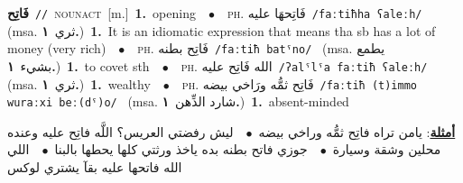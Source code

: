 \documentclass[10pt,a4paper,twoside]{article} %
\begin{document}
\begin{multicols}{2}
{\setlength\topsep{0pt}\textbf{\foreignlanguage{arabic}{فَاتِح}}\ {\color{gray}\texttt{//}\color{black}}\ \textsc{noun\textunderscore act}\ [m.]\ \textbf{1.}~opening\ \ $\bullet$\ \ \textsc{ph.} \color{gray} \foreignlanguage{arabic}{فَاتِحهَا عليه}\color{black}\ {\color{gray}\texttt{/{\sffamily faːtiħha ʕaleːh}/}\color{black}}\ \color{gray} (msa. \foreignlanguage{arabic}{ثري}~\foreignlanguage{arabic}{\textbf{١.}})\color{black}\ \textbf{1.}~It is an idiomatic expression that means tha sb has a lot of money (very rich)\ \ $\bullet$\ \ \textsc{ph.} \color{gray} \foreignlanguage{arabic}{فَاتِح بطنه}\color{black}\ {\color{gray}\texttt{/{\sffamily faːtiħ batˤno}/}\color{black}}\ \color{gray} (msa. \foreignlanguage{arabic}{يطمع بشيء}~\foreignlanguage{arabic}{\textbf{١.}})\color{black}\ \textbf{1.}~to covet sth\ \ $\bullet$\ \ \textsc{ph.} \color{gray} \foreignlanguage{arabic}{الله فَاتِح عليه}\color{black}\ {\color{gray}\texttt{/{\sffamily ʔalˤlˤa faːtiħ ʕaleːh}/}\color{black}}\ \color{gray} (msa. \foreignlanguage{arabic}{ثري}~\foreignlanguage{arabic}{\textbf{١.}})\color{black}\ \textbf{1.}~wealthy\ \ $\bullet$\ \ \textsc{ph.} \color{gray} \foreignlanguage{arabic}{فَاتِح ثمُّه ورَاخي بيضه}\color{black}\ {\color{gray}\texttt{/{\sffamily faːtiħ (t)immo wuraːxi beː(dˤ)o}/}\color{black}}\ \color{gray} (msa. \foreignlanguage{arabic}{شارد الذِّهن}~\foreignlanguage{arabic}{\textbf{١.}})\color{black}\ \textbf{1.}~absent-minded\  \begin{flushright}\color{gray}\foreignlanguage{arabic}{\textbf{\underline{\foreignlanguage{arabic}{أمثلة}}}: يامن تراه فاتِح ثمُّه وراخي بيضه\ $\bullet$\ \  ليش رفضتي العريس؟ اللَّه فاتِح عليه وعنده محلين وشقة وسيارة\ $\bullet$\ \  جوزي فاتح بطنه بده ياخذ ورثتي كلها يحطها بالبنا\ $\bullet$\ \  اللي الله فاتحها عليه بقآ يشتري لوكس}\end{flushright}\color{black}} \vspace{2mm}


\end{multicols}
\end{document}
